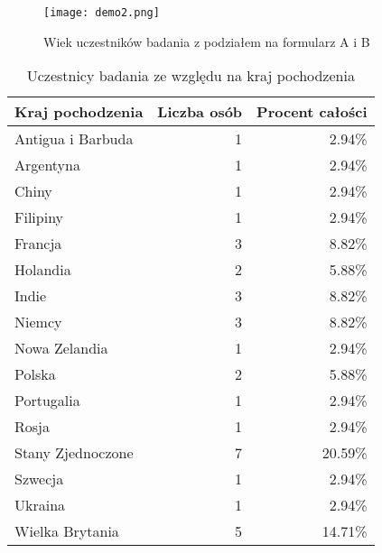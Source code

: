 \begin{figure}[h!]
    \centering
    \texttt{[image: demo2.png]}
    \caption{Wiek uczestników badania z podziałem na formularz A i B}
    \label{fig:ch7_demo2}
\end{figure}

\begin{table}[h!]
    \begin{center}
        \begin{tabular}{|l|r|r|}
            \hline
            Kraj pochodzenia  & Liczba osób & Procent całości \\
            \hline
            Antigua i Barbuda & 1           & 2.94\%          \\
            Argentyna         & 1           & 2.94\%          \\
            Chiny             & 1           & 2.94\%          \\
            Filipiny          & 1           & 2.94\%          \\
            Francja           & 3           & 8.82\%          \\
            Holandia          & 2           & 5.88\%          \\
            Indie             & 3           & 8.82\%          \\
            Niemcy            & 3           & 8.82\%          \\
            Nowa Zelandia     & 1           & 2.94\%          \\
            Polska            & 2           & 5.88\%          \\
            Portugalia        & 1           & 2.94\%          \\
            Rosja             & 1           & 2.94\%          \\
            Stany Zjednoczone & 7           & 20.59\%         \\
            Szwecja           & 1           & 2.94\%          \\
            Ukraina           & 1           & 2.94\%          \\
            Wielka Brytania   & 5           & 14.71\%         \\
            \hline
        \end{tabular}
    \end{center}
    \caption{Uczestnicy badania ze względu na kraj pochodzenia}\label{tab1:ch7_3}
\end{table}

